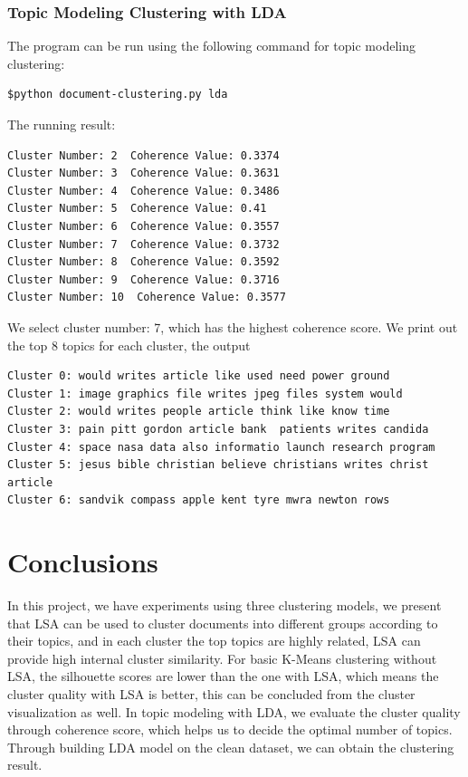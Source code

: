 \documentclass[12pt]{article}
\begin{document}
\subsubsection{Topic Modeling Clustering with LDA}
The program can be run using the following command for topic modeling clustering:
\begin{lstlisting}[frame=none]
$python document-clustering.py lda
\end{lstlisting}
The running result:
\begin{lstlisting}[frame=single, captionpos=b, caption=Coherence Score List, label=listing:sparql_getallindividuals,]
Cluster Number: 2  Coherence Value: 0.3374
Cluster Number: 3  Coherence Value: 0.3631
Cluster Number: 4  Coherence Value: 0.3486
Cluster Number: 5  Coherence Value: 0.41
Cluster Number: 6  Coherence Value: 0.3557
Cluster Number: 7  Coherence Value: 0.3732
Cluster Number: 8  Coherence Value: 0.3592
Cluster Number: 9  Coherence Value: 0.3716
Cluster Number: 10  Coherence Value: 0.3577
\end{lstlisting}
We select cluster number: 7, which has the highest coherence score. We print out the top 8 topics for each cluster, the output 
\begin{lstlisting}[frame=single, captionpos=b, caption=Topic Modeling Cluster Result, label=listing:sparql_getallindividuals,]
Cluster 0: would writes article like used need power ground  
Cluster 1: image graphics file writes jpeg files system would  
Cluster 2: would writes people article think like know time  
Cluster 3: pain pitt gordon article bank  patients writes candida  
Cluster 4: space nasa data also informatio launch research program  
Cluster 5: jesus bible christian believe christians writes christ article  
Cluster 6: sandvik compass apple kent tyre mwra newton rows  
\end{lstlisting}


\section{Conclusions} 
In this project, we have experiments using three clustering models, we present that LSA can be used to cluster documents into different groups according to their topics, and in each cluster the top topics are highly related, LSA can provide high internal cluster similarity. For basic K-Means clustering without LSA, the silhouette scores are lower than the one with LSA, which means the cluster quality with LSA is better, this can be concluded from the cluster visualization as well. In topic modeling with LDA, we evaluate the cluster quality through coherence score, which helps us to decide the optimal number of topics. Through building LDA model on the clean dataset, we can obtain the clustering result.  
\par
\end{document}
